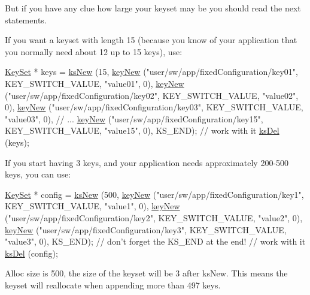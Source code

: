 But if you have any clue how large your keyset may be you should read the next statements.

If you want a keyset with length 15 (because you know of your application that you normally need about 12 up to 15 keys), use\-: 
\begin{DoxyCode}
\hyperlink{classkdb_1_1KeySet_a4eac9850fa4f06c07a5306befc3e4377}{KeySet} * keys = \hyperlink{group__keyset_ga671e1aaee3ae9dc13b4834a4ddbd2c3c}{ksNew} (15,
        \hyperlink{group__key_gaf6893c038b3ebee90c73a9ea8356bebf}{keyNew} (\textcolor{stringliteral}{"user/sw/app/fixedConfiguration/key01"}, KEY\_SWITCH\_VALUE,
       \textcolor{stringliteral}{"value01"}, 0),
        \hyperlink{group__key_gaf6893c038b3ebee90c73a9ea8356bebf}{keyNew} (\textcolor{stringliteral}{"user/sw/app/fixedConfiguration/key02"}, KEY\_SWITCH\_VALUE,
       \textcolor{stringliteral}{"value02"}, 0),
        \hyperlink{group__key_gaf6893c038b3ebee90c73a9ea8356bebf}{keyNew} (\textcolor{stringliteral}{"user/sw/app/fixedConfiguration/key03"}, KEY\_SWITCH\_VALUE,
       \textcolor{stringliteral}{"value03"}, 0),
        \textcolor{comment}{// ...}
        \hyperlink{group__key_gaf6893c038b3ebee90c73a9ea8356bebf}{keyNew} (\textcolor{stringliteral}{"user/sw/app/fixedConfiguration/key15"}, KEY\_SWITCH\_VALUE,
       \textcolor{stringliteral}{"value15"}, 0),
        KS\_END);
\textcolor{comment}{// work with it}
\hyperlink{group__keyset_ga27e5c16473b02a422238c8d970db7ac8}{ksDel} (keys);
\end{DoxyCode}


If you start having 3 keys, and your application needs approximately 200-\/500 keys, you can use\-: 
\begin{DoxyCode}
\hyperlink{classkdb_1_1KeySet_a4eac9850fa4f06c07a5306befc3e4377}{KeySet} * config = \hyperlink{group__keyset_ga671e1aaee3ae9dc13b4834a4ddbd2c3c}{ksNew} (500,
        \hyperlink{group__key_gaf6893c038b3ebee90c73a9ea8356bebf}{keyNew} (\textcolor{stringliteral}{"user/sw/app/fixedConfiguration/key1"}, KEY\_SWITCH\_VALUE, \textcolor{stringliteral}{
      "value1"}, 0),
        \hyperlink{group__key_gaf6893c038b3ebee90c73a9ea8356bebf}{keyNew} (\textcolor{stringliteral}{"user/sw/app/fixedConfiguration/key2"}, KEY\_SWITCH\_VALUE, \textcolor{stringliteral}{
      "value2"}, 0),
        \hyperlink{group__key_gaf6893c038b3ebee90c73a9ea8356bebf}{keyNew} (\textcolor{stringliteral}{"user/sw/app/fixedConfiguration/key3"}, KEY\_SWITCH\_VALUE, \textcolor{stringliteral}{
      "value3"}, 0),
        KS\_END); \textcolor{comment}{// don't forget the KS\_END at the end!}
\textcolor{comment}{// work with it}
\hyperlink{group__keyset_ga27e5c16473b02a422238c8d970db7ac8}{ksDel} (config);
\end{DoxyCode}
 Alloc size is 500, the size of the keyset will be 3 after ks\-New. This means the keyset will reallocate when appending more than 497 keys.


